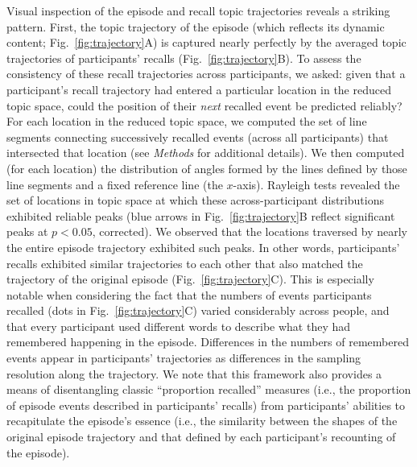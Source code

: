 \documentclass[10pt]{article}
\begin{document}
Visual inspection of the episode and recall topic trajectories reveals a striking pattern.  First, the topic trajectory of the episode (which reflects its dynamic content; Fig.~\ref{fig:trajectory}A) is captured nearly perfectly by the averaged topic trajectories of participants' recalls (Fig.~\ref{fig:trajectory}B).  To assess the consistency of these recall trajectories across participants, we asked: given that a participant's recall trajectory had entered a particular location in the reduced topic space, could the position of their \textit{next} recalled event be predicted reliably?  For each location in the reduced topic space, we computed the set of line segments connecting successively recalled events (across all participants) that intersected that location (see \textit{Methods} for additional details).  We then computed (for each location) the distribution of angles formed by the lines defined by those line segments and a fixed reference line (the $x$-axis).  Rayleigh tests revealed the set of locations in topic space at which these across-participant distributions exhibited reliable peaks (blue arrows in Fig.~\ref{fig:trajectory}B reflect significant peaks at $p < 0.05$, corrected).  We observed that the locations traversed by nearly the entire episode trajectory exhibited such peaks.  In other words, participants' recalls exhibited similar trajectories to each other that also matched the trajectory of the original episode (Fig.~\ref{fig:trajectory}C).  This is especially notable when considering the fact that the numbers of events participants recalled (dots in Fig.~\ref{fig:trajectory}C) varied considerably across people, and that every participant used different words to describe what they had remembered happening in the episode.  Differences in the numbers of remembered events appear in participants' trajectories as differences in the sampling resolution along the trajectory.  We note that this framework also provides a means of disentangling classic ``proportion recalled'' measures (i.e., the proportion of episode events described in participants' recalls) from participants' abilities to recapitulate the episode's essence (i.e., the similarity between the shapes of the original episode trajectory and that defined by each participant's recounting of the episode).
\end{document}
